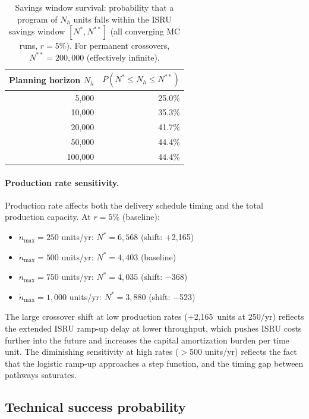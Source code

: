 \documentclass[preprint,12pt]{elsarticle}
\begin{document}
\begin{table}[htbp]
\centering
\caption{Savings window survival: probability that a program of $N_h$ units falls within the ISRU savings window $[N^*, N^{**}]$ (all converging MC runs, $r = 5\%$). For permanent crossovers, $N^{**} = 200{,}000$ (effectively infinite).}
\label{tab:savings_survival}
\small
\begin{tabular}{@{}rr@{}}
\toprule
Planning horizon $N_h$ & $P(N^* \leq N_h \leq N^{**})$ \\
\midrule
5{,}000   & 25.0\% \\
10{,}000  & 35.3\% \\
20{,}000  & 41.7\% \\
50{,}000  & 44.4\% \\
100{,}000 & 44.4\% \\
\bottomrule
\end{tabular}
\end{table}

\paragraph{Production rate sensitivity.} Production rate affects both the delivery schedule timing and the total production capacity. At $r = 5\%$ (baseline):

\begin{itemize}
\item $\dot{n}_{\max} = 250$ units/yr: $N^* = 6{,}568$ (shift: $+$2{,}165)
\item $\dot{n}_{\max} = 500$ units/yr: $N^* = 4{,}403$ (baseline)
\item $\dot{n}_{\max} = 750$ units/yr: $N^* = 4{,}035$ (shift: $-$368)
\item $\dot{n}_{\max} = 1{,}000$ units/yr: $N^* = 3{,}880$ (shift: $-$523)
\end{itemize}

The large crossover shift at low production rates ($+$2{,}165~units at 250/yr) reflects the extended ISRU ramp-up delay at lower throughput, which pushes ISRU costs further into the future and increases the capital amortization burden per time unit. The diminishing sensitivity at high rates ($>$500 units/yr) reflects the fact that the logistic ramp-up approaches a step function, and the timing gap between pathways saturates.

\subsection{Technical success probability}
\label{sec:success_probability}
\end{document}
